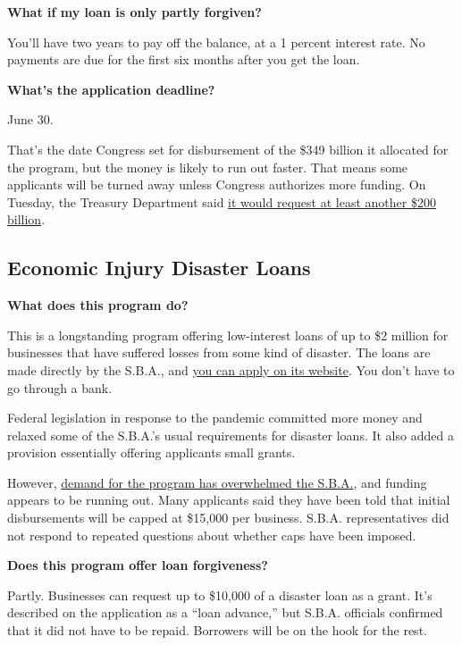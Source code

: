 \textbf{What if my loan is only partly forgiven?}

You'll have two years to pay off the balance, at a 1 percent interest
rate. No payments are due for the first six months after you get the
loan.

\textbf{What's the application deadline?}

June 30.

That's the date Congress set for disbursement of the \$349 billion it
allocated for the program, but the money is likely to run out faster.
That means some applicants will be turned away unless Congress
authorizes more funding. On Tuesday, the Treasury Department said
\href{https://www.nytimes3xbfgragh.onion/2020/04/07/business/stock-market-today-coronavirus.html\#link-4be214b5}{it
would request at least another \$200 billion}.

\hypertarget{economic-injury-disaster-loans}{%
\subsection{Economic Injury Disaster
Loans}\label{economic-injury-disaster-loans}}

\textbf{What does this program do?}

This is a longstanding program offering low-interest loans of up to \$2
million for businesses that have suffered losses from some kind of
disaster. The loans are made directly by the S.B.A., and
\href{https://covid19relief.sba.gov/\#/}{you can apply on its website}.
You don't have to go through a bank.

Federal legislation in response to the pandemic committed more money and
relaxed some of the S.B.A.'s usual requirements for disaster loans. It
also added a provision essentially offering applicants small grants.

However,
\href{https://www.nytimes3xbfgragh.onion/2020/04/09/business/smallbusiness/small-business-disaster-loans-coronavirus.html}{demand
for the program has overwhelmed the S.B.A.}, and funding appears to be
running out. Many applicants said they have been told that initial
disbursements will be capped at \$15,000 per business. S.B.A.
representatives did not respond to repeated questions about whether caps
have been imposed.

\textbf{Does this program offer loan forgiveness?}

Partly. Businesses can request up to \$10,000 of a disaster loan as a
grant. It's described on the application as a ``loan advance,'' but
S.B.A. officials confirmed that it did not have to be repaid. Borrowers
will be on the hook for the rest.

